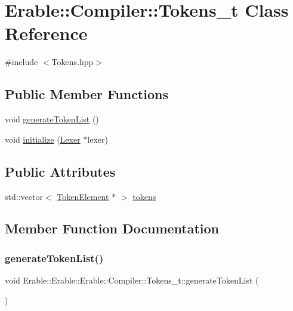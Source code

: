 \hypertarget{class_erable_1_1_compiler_1_1_tokens__t}{}\section{Erable\+::Compiler\+::Tokens\+\_\+t Class Reference}
\label{class_erable_1_1_compiler_1_1_tokens__t}


{\ttfamily \#include $<$Tokens.\+hpp$>$}

\subsection*{Public Member Functions}
\begin{DoxyCompactItemize}
\item 
void \mbox{\hyperlink{class_erable_1_1_compiler_1_1_tokens__t_addb1ae9a0bb30d3a58de3128d83c9769}{generate\+Token\+List}} ()
\item 
void \mbox{\hyperlink{class_erable_1_1_compiler_1_1_tokens__t_a26021ac374aac74592831644583b0bbe}{initialize}} (\mbox{\hyperlink{class_lexer}{Lexer}} $\ast$lexer)
\end{DoxyCompactItemize}
\subsection*{Public Attributes}
\begin{DoxyCompactItemize}
\item 
std\+::vector$<$ \mbox{\hyperlink{class_erable_1_1_compiler_1_1_token_element}{Token\+Element}} $\ast$ $>$ \mbox{\hyperlink{class_erable_1_1_compiler_1_1_tokens__t_a9c933a1377e829ec2b6b84a7e0417d98}{tokens}}
\end{DoxyCompactItemize}


\subsection{Member Function Documentation}
\mbox{\label{class_erable_1_1_compiler_1_1_tokens__t_addb1ae9a0bb30d3a58de3128d83c9769}} 
\subsubsection{\texorpdfstring{generateTokenList()}{generateTokenList()}}
{\footnotesize\ttfamily void Erable\+::\+Erable\+::\+Erable\+::\+Compiler\+::\+Tokens\+\_\+t\+::generate\+Token\+List (\begin{DoxyParamCaption}{ }\end{DoxyParamCaption})}

